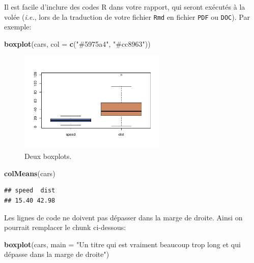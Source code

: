 \documentclass[mstat,12pt]{unswthesis}
\newenvironment{Shaded}{\begin{snugshade}}{\end{snugshade}}
\newcommand{\AttributeTok}[1]{\textcolor[rgb]{0.13,0.29,0.53}{#1}}
\newcommand{\FunctionTok}[1]{\textcolor[rgb]{0.13,0.29,0.53}{\textbf{#1}}}
\newcommand{\NormalTok}[1]{#1}
\newcommand{\StringTok}[1]{\textcolor[rgb]{0.31,0.60,0.02}{#1}}
\begin{document}
Il est facile d'inclure des codes R dans votre rapport, qui seront
exécutés à la volée (\emph{i.e.}, lors de la traduction de votre fichier
\texttt{Rmd} en fichier \texttt{PDF} ou \texttt{DOC}). Par exemple:

\begin{Shaded}
\begin{Highlighting}[]
\FunctionTok{boxplot}\NormalTok{(cars, }\AttributeTok{col =} \FunctionTok{c}\NormalTok{(}\StringTok{"\#5975a4"}\NormalTok{, }\StringTok{"\#cc8963"}\NormalTok{))}
\end{Highlighting}
\end{Shaded}

\begin{figure}

{\centering \includegraphics[width=7cm]{scdon2-UPV-report-template_sansPython_files/figure-latex/unnamed-chunk-2-1} 

}

\caption{\label{fig:boxplots}Deux boxplots.}\label{fig:unnamed-chunk-2}
\end{figure}

\begin{Shaded}
\begin{Highlighting}[]
\FunctionTok{colMeans}\NormalTok{(cars)}
\end{Highlighting}
\end{Shaded}

\begin{verbatim}
## speed  dist 
## 15.40 42.98
\end{verbatim}

Les lignes de code ne doivent pas dépasser dans la marge de droite.
Ainsi on pourrait remplacer le chunk ci-dessous:

\begin{Shaded}
\begin{Highlighting}[]
\FunctionTok{boxplot}\NormalTok{(cars, }\AttributeTok{main =} \StringTok{"Un titre qui est vraiment beaucoup trop long et qui dépasse dans la marge de droite"}\NormalTok{)}
\end{Highlighting}
\end{Shaded}
\end{document}

